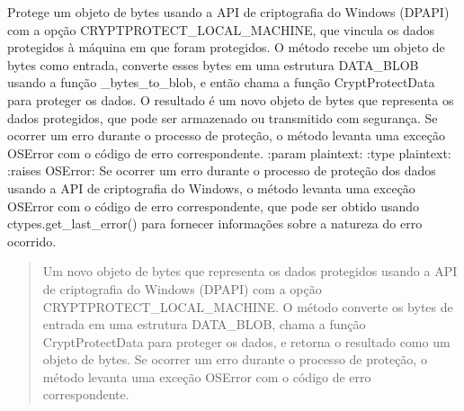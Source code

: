 \documentclass[letterpaper,10pt,english]{sphinxmanual}
\begin{document}

\begin{fulllineitems}
\label{\detokenize{api/simple_lock:simple_lock.dpapi_protect_localmachine}}
\pysigstartsignatures
\pysiglinewithargsret
{}
{}
{}
\pysigstopsignatures
\sphinxAtStartPar
Protege um objeto de bytes usando a API de criptografia do Windows (DPAPI) com a opção CRYPTPROTECT\_LOCAL\_MACHINE, que vincula os dados protegidos à máquina em que foram protegidos. O método recebe um objeto de bytes como entrada, converte esses bytes em uma estrutura DATA\_BLOB usando a função \_bytes\_to\_blob, e então chama a função CryptProtectData para proteger os dados. O resultado é um novo objeto de bytes que representa os dados protegidos, que pode ser armazenado ou transmitido com segurança. Se ocorrer um erro durante o processo de proteção, o método levanta uma exceção OSError com o código de erro correspondente.
:param plaintext:
:type plaintext: 
:raises OSError: Se ocorrer um erro durante o processo de proteção dos dados usando a API de criptografia do Windows, o método levanta uma exceção OSError com o código de erro correspondente, que pode ser obtido usando ctypes.get\_last\_error() para fornecer informações sobre a natureza do erro ocorrido.
\begin{quote}\begin{description}
\sphinxAtStartPar
Um novo objeto de bytes que representa os dados protegidos usando a API de criptografia do Windows (DPAPI) com a opção CRYPTPROTECT\_LOCAL\_MACHINE. O método converte os bytes de entrada em uma estrutura DATA\_BLOB, chama a função CryptProtectData para proteger os dados, e retorna o resultado como um objeto de bytes. Se ocorrer um erro durante o processo de proteção, o método levanta uma exceção OSError com o código de erro correspondente.

\sphinxAtStartPar
{}

\end{description}\end{quote}

\end{fulllineitems}
\end{document}
